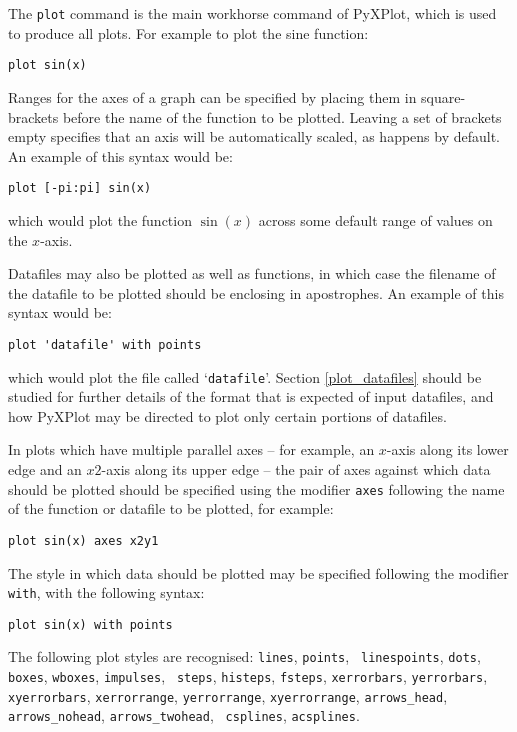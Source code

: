 The {\tt plot} command is the main workhorse command of PyXPlot, which is used
to produce all plots. For example to plot the sine function:

\begin{verbatim}
plot sin(x)
\end{verbatim}

Ranges for the axes of a graph can be specified by placing them in
square-brackets before the name of the function to be plotted. Leaving a set of
brackets empty specifies that an axis will be automatically scaled, as happens
by default. An example of this syntax would be:

\begin{verbatim}
plot [-pi:pi] sin(x)
\end{verbatim}

\noindent which would plot the function $\sin(x)$ across some default range of
values on the $x$-axis.

Datafiles may also be plotted as well as functions, in which case the filename
of the datafile to be plotted should be enclosing in apostrophes. An example of
this syntax would be:

\begin{verbatim}
plot 'datafile' with points
\end{verbatim}

\noindent which would plot the file called `{\tt datafile}'.  Section
\ref{plot_datafiles} should be studied for further details of the format that is
expected of input datafiles, and how PyXPlot may be directed to plot only
certain portions of datafiles.

In plots which have multiple parallel axes -- for example, an $x$-axis along its
lower edge and an $x2$-axis along its upper edge -- the pair of axes against
which data should be plotted should be specified using the modifier {\tt axes}
following the name of the function or datafile to be plotted, for example:

\begin{verbatim}
plot sin(x) axes x2y1
\end{verbatim}

The style in which data should be plotted may be specified following the
modifier {\tt with}, with the following syntax:

\begin{verbatim}
plot sin(x) with points
\end{verbatim}

The following plot styles are recognised: {\tt lines}, {\tt points}, {\tt
linespoints}, {\tt dots}, {\tt boxes}, {\tt wboxes}, {\tt impulses}, {\tt
steps}, {\tt histeps}, {\tt fsteps}, {\tt xerrorbars}, {\tt yerrorbars}, {\tt
xyerrorbars}, {\tt xerrorrange}, {\tt yerrorrange}, {\tt xyerrorrange},
\newline\noindent %
{\tt arrows\_head}, {\tt arrows\_nohead}, {\tt arrows\_twohead}, {\tt
csplines}, {\tt acsplines}.

